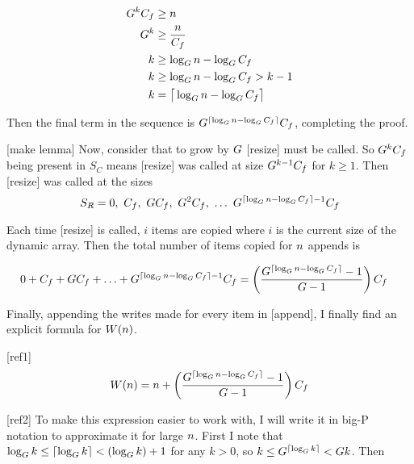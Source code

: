 \begin{align*}
G^kC_f &\geq n\\
G^k &\geq \frac{n}{C_f}\\
k &\geq \log_{G} n - \log_{G} C_f\\
k &\geq \log_{G} n - \log_{G} C_f > k - 1\\
k &= \big\lceil \log_{G} n - \log_{G} C_f \big\rceil
\end{align*}

Then the final term in the sequence is $G^{\lceil \log_{G} n - \log_{G} C_f \rceil}C_f$, completing the proof.

[make lemma]
Now, consider that to grow by $G$ [resize] must be called. So $G^kC_f$ being present in $S_C$ means [resize] was called at size $G^{k - 1}C_f$ for $k \geq 1$. Then [resize] was called at the sizes $$S_R = 0,\ \initcapacity,\ \growthfactor\initcapacity,\ \growthfactor^2\initcapacity,\ \ldots\ \growthfactor^{\lceil \log_{\growthfactor} \varnitems - \log_{\growthfactor} \initcapacity \rceil - 1}\initcapacity$$

Each time [resize] is called, $i$ items are copied where $i$ is the current size of the dynamic array. Then the total number of items copied for $n$ appends is

\begin{align*}
0 + C_f + GC_f + \ldots + G^{\lceil \log_{G} n - \log_{G} C_f \rceil - 1}C_f &= \left( \frac{G^{\lceil \log_{G} n - \log_{G} C_f \rceil} - 1}{G - 1} \right) C_f
\end{align*}

Finally, appending the writes made for every item in [append], I finally find an explicit formula for $W(n)$.

[ref1]
$$
W(n) = n + \left( \frac{G^{\lceil \log_{G} n - \log_{G} C_f \rceil} - 1}{G - 1} \right) C_f
$$

[ref2]
To make this expression easier to work with, I will write it in big-P notation to approximate it for large $n$. First I note that $\log_{G} k \leq \lceil \log_{G} k \rceil < \left( \log_{G} k \right) + 1$ for any $k > 0$, so $k \leq G^{\lceil \log_{G} k \rceil} < G{k}$. Then

